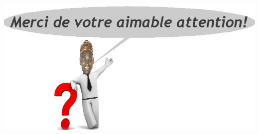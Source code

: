 \documentclass[10pt]{beamer}
\begin{document}
\begin{frame}%
\frametitle{}

    \includegraphics[scale=0.43]{images/merci_de_votre_attention}
\end{frame}


\end{document}
